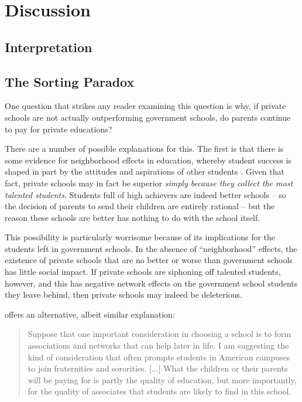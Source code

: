 \documentclass[12pt]{article}
\begin{document}



\section{Discussion}\label{}

\subsection{Interpretation}\label{}

\subsection{The Sorting Paradox}\label{}
One question that strikes any reader examining this question is why, if private schools are not actually outperforming government schools, do parents continue to pay for private educations?

There are a number of possible explanations for this. The first is that there is some evidence for neighborhood effects in education, whereby student success is shaped in part by the attitudes and aspirations of other students \citep{Goddard:2003to, Pong:1998ts, Roscigno:2000wt, Jencks:1990tw}. Given that fact, private schools may in fact be superior \emph{simply because they collect the most talented students}. Students full of high achievers are indeed better schools -- so the decision of parents to send their children are entirely rational -- but the reason these schools are better has nothing to do with the school itself.

This possibility is particularly worrisome because of its implications for the students left in government schools. In the absence of ``neighborhood'' effects, the existence of private schools that are no better or worse than government schools has little social impact. If private schools are siphoning off talented students, however, and this has negative network effects on the government school students they leave behind, then private schools may indeed be deleterious.

\cite{Basu:2009uu} offers an alternative, albeit similar explanation:
\begin{quote}
	Suppose that one important consideration in choosing a school is to form associations and networks that can help later in life. I am suggesting the kind of consideration that often prompts students in American campuses to join fraternities and sororities. [...] What the children or their parents will be paying for is partly the quality of education, but more importantly, for the quality of associates that students are likely to find in this school.
\end{quote}
\end{document}
